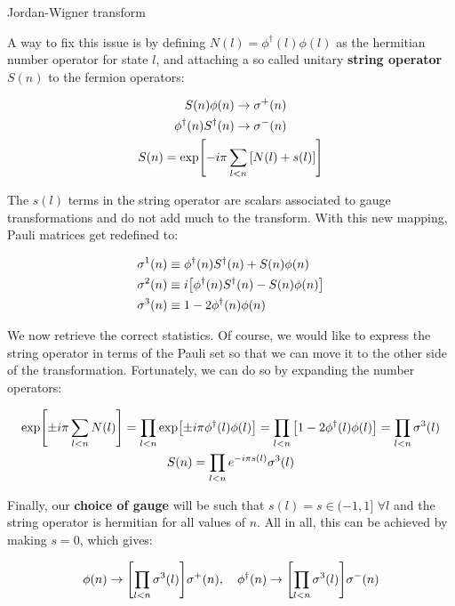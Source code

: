 \documentclass[9pt, handout, aspectratio=169]{beamer}	%
\begin{document}
\begin{frame}[allowframebreaks]{Jordan-Wigner transform}
\break

	A way to fix this issue is by defining $N(l)=\phi^{\dagger}(l)\phi(l)$ as the hermitian number operator for state $l$, and attaching a so called unitary \textbf{string operator} $S(n)$ to the fermion operators:

	\begin{gather*}
		\begin{split}
			S(n)\phi(n) &\rightarrow \sigma^{+}(n) \\
			\phi^{\dagger}(n)S^{\dagger}(n) &\rightarrow \sigma^{-}(n)
		\end{split} \\
		S(n) = \exp[ -i\pi \sum_{l<n} \qty[N(l)+s(l)] ]
	\end{gather*}

	\vspace{-0.5em}

	The $s(l)$ terms in the string operator are scalars associated to gauge transformations and do not add much to the transform. With this new mapping, Pauli matrices get redefined to:

	\begin{align*}
		\sigma^{1}(n) &\equiv
			\phi^{\dagger}(n)S^{\dagger}(n) + S(n)\phi(n) \\
		\sigma^{2}(n) &\equiv
			i\qty[\phi^{\dagger}(n)S^{\dagger}(n) - S(n)\phi(n)] \\
		\sigma^{3}(n) &\equiv
			1 - 2\phi^{\dagger}(n)\phi(n)
	\end{align*}

\break

	We now retrieve the correct statistics. Of course, we would like to express the string operator in terms of the Pauli set so that we can move it to the other side of the transformation. Fortunately, we can do so by expanding the number operators:

	\begin{gather*}
	  \exp[\pm i\pi \sum_{l<n} N(l)] =
		  \prod_{l<n}\exp[\pm i\pi \phi^{\dagger}(l)\phi(l)] =
		  \prod_{l<n}\qty[1-2\phi^{\dagger}(l)\phi(l)] =
		  \prod_{l<n}\sigma^3(l) \\
		S(n) = \prod_{l<n} e^{-i\pi s(l)} \sigma^3(l)
	\end{gather*}

	Finally, our \textbf{choice of gauge} will be such that $s(l) = s \in (-1,1]$ $\forall l$ and the string operator is hermitian for all values of $n$. All in all, this can be achieved by making $s=0$, which gives:

	\begin{gather*}
		\phi(n) \ra \qty[\prod_{l<n} \sigma^3(l)]\sigma^{+}(n) \qc
		\phi^{\dagger}(n) \ra \qty[\prod_{l<n} \sigma^3(l)]\sigma^{-}(n)
	\end{gather*}

\end{frame}
\end{document}
